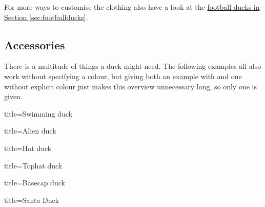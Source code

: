 \documentclass[parskip=half]{scrartcl}
\begin{document}
For more ways to customise the clothing also have a look at the \hyperref[sec:footballducks]{football ducks in Section \ref{sec:footballducks}}.

\clearpage
\subsection{Accessories}
\label{sec:accessories}

There is a multitude of things a duck might need. The following examples all also work without specifying a colour, but giving both an example with and one without explicit colour just makes this overview unnecessary long, so only one is given.

\begin{tcblisting}{title={Swimming duck}}
\begin{tikzpicture}
	\duck[water=cyan!50!blue]
\end{tikzpicture}
\end{tcblisting}

\begin{tcblisting}{title={Alien duck}}
\begin{tikzpicture}
	\duck[alien=green!50!brown]
\end{tikzpicture}
\end{tcblisting}

\begin{tcblisting}{title={Hat duck}}
\begin{tikzpicture}
	\duck[hat=red!50!black]
\end{tikzpicture}
\end{tcblisting}

\begin{tcblisting}{title={Tophat duck}}
\begin{tikzpicture}
	\duck[tophat=blue!20!black]
\end{tikzpicture}
\end{tcblisting}

\begin{tcblisting}{title={Basecap duck}}
\begin{tikzpicture}
	\duck[cap=red!80!black]
\end{tikzpicture}
\end{tcblisting}

\begin{tcblisting}{title={Santa Duck}}
\begin{tikzpicture}
	\duck[santa=red!80!black, 
	      beard=white!80!brown]
\end{tikzpicture}
\end{tcblisting}
\end{document}
